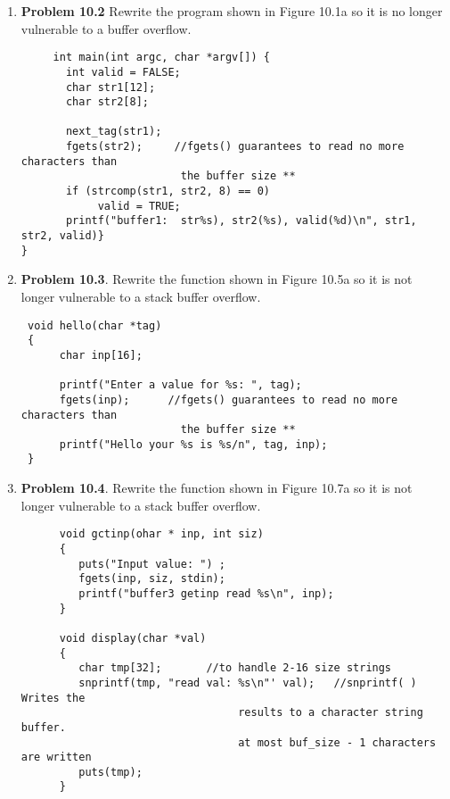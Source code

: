 \documentclass[12pt]{article}
\begin{document}
\begin{enumerate}
	\vspace{10pt}
	
	\item {\textbf{Problem 10.2} Rewrite the program shown in Figure 10.1a so it is no longer vulnerable to a buffer overflow.}
	 
	 \begin{verbatim}
	 int main(int argc, char *argv[]) {
       int valid = FALSE;
       char str1[12];
       char str2[8];
 
       next_tag(str1);
       fgets(str2);     //fgets() guarantees to read no more characters than 
                         the buffer size **
       if (strcomp(str1, str2, 8) == 0)
            valid = TRUE;
       printf("buffer1:  str%s), str2(%s), valid(%d)\n", str1, str2, valid)}
}
	\end{verbatim}
	
	\vspace{10pt}


	
	\item {\textbf{Problem 10.3}. Rewrite the function shown in Figure 10.5a so it is not longer vulnerable to a stack buffer overflow.}

	\begin{verbatim}
 void hello(char *tag)
 {
      char inp[16];
 
      printf("Enter a value for %s: ", tag);
      fgets(inp);      //fgets() guarantees to read no more characters than 
                         the buffer size **
      printf("Hello your %s is %s/n", tag, inp);
 }
	\end{verbatim}
			
		\vspace{10pt}
	
	
	\item {\textbf{Problem 10.4}. Rewrite the function shown in Figure 10.7a so it is not longer vulnerable to a stack buffer overflow.} 
	  
	  \begin{verbatim}
	  void gctinp(ohar * inp, int siz)
	  {
	     puts("Input value: ") ;
	     fgets(inp, siz, stdin);
	     printf("buffer3 getinp read %s\n", inp);
	  }
	  
	  void display(char *val)
	  {
	     char tmp[32];       //to handle 2-16 size strings
	     snprintf(tmp, "read val: %s\n"' val);   //snprintf( ) Writes the 
	                              results to a character string buffer. 
	                              at most buf_size - 1 characters are written
	     puts(tmp);
	  }
	  

\end{verbatim}
\end{enumerate}
\end{document}
